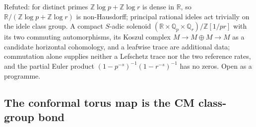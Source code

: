 \begin{observation}
\label{obs:gl1-two-prime-solenoid}
Refuted: for distinct primes $\mathbb Z\log p+\mathbb Z\log r$ is dense in $\mathbb R$, so $\mathbb R/(\mathbb Z\log p+\mathbb Z\log r)$
is non-Hausdorff; principal rational ideles act trivially on the idele class group. A compact $S$-adic solenoid
$(\mathbb R\times\mathbb Q_p\times\mathbb Q_r)/\mathbb Z[1/pr]$ with its two commuting automorphisms, its Koszul complex
$M\to M\oplus M\to M$ as a candidate horizontal cohomology, and a leafwise trace are additional data; commutation alone
supplies neither a Lefschetz trace nor the two reference rates, and the partial Euler product $(1-p^{-s})^{-1}(1-r^{-s})^{-1}$
has no zeros. Open as a programme.
\end{observation}

\subsection{The conformal torus map is the CM class-group bond}

